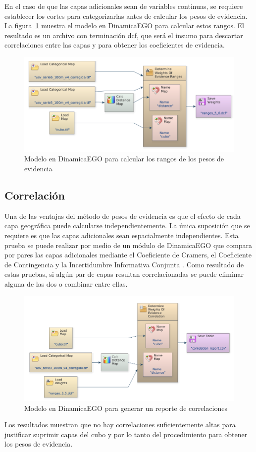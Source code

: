 \documentclass[12pt,a4paper,oldfontcommands]{article}
\begin{document}
 En el caso de que las capas adicionales sean de variables continuas, se requiere establecer los cortes para categorizarlas antes de calcular los pesos de evidencia. La figura~\ref{fig:ranges} muestra el modelo en DinamicaEGO para calcular estos rangos. El resultado es un archivo con terminación dcf, que será el insumo para descartar correlaciones entre las capas y para obtener los coeficientes de evidencia.
 
\bigskip
\begin{figure}[H]
	\centering
	\includegraphics[width=1\textwidth]{./figuras/ranges.png}
	\caption{Modelo en DinamicaEGO para calcular los rangos de los pesos de evidencia}
	\label{fig:ranges}
\end{figure}
\subsection{Correlación}
Una de las ventajas del método de pesos de evidencia es que el efecto de cada capa geográfica puede calcularse independientemente. La única suposición que se requiere es que las capas adicionales sean espacialmente independientes. Esta prueba se puede realizar por medio de un módulo de DinamicaEGO que compara por pares las capas adicionales mediante el Coeficiente de Cramers, el Coeficiente de Contingencia y la Incertidumbre Informativa Conjunta \parencite{cap8_1994}. Como resultado de estas pruebas, si algún par de capas resultan correlacionadas se puede eliminar alguna de las dos o combinar entre ellas.
 
\begin{figure}[H]
	\centering
	\includegraphics[width=1\textwidth]{./figuras/correlacion.png}
	\caption{Modelo en DinamicaEGO para generar un reporte de correlaciones}
\end{figure}
Los resultados muestran que no hay correlaciones suficientemente altas para justificar suprimir capas del cubo y por lo tanto del procedimiento para obtener los pesos de evidencia.
\end{document}
